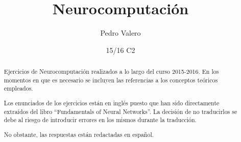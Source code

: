 \documentclass[nochap,palatino]{apuntes}
\title{Neurocomputación}
\author{Pedro Valero}
\date{15/16 C2}
\begin{document}
\pagestyle{plain}

\begin{abstract}
Ejercicios de Neurocomputación realizados a lo largo del curso 2015-2016. En los momentos en que es necesario se incluyen las referencias a los conceptos teóricos empleados.

Los enunciados de los ejercicios están en inglés puesto que han sido directamente extraídos del libro ``Fundamentals of Neural Networks''. La decisión de no traducirlos se debe al riesgo de introducir errores en los mismos durante la traducción.

No obstante, las respuestas están redactadas en español.
\end{abstract}

\maketitle

\tableofcontents
\newpage


\printindex
\end{document}
